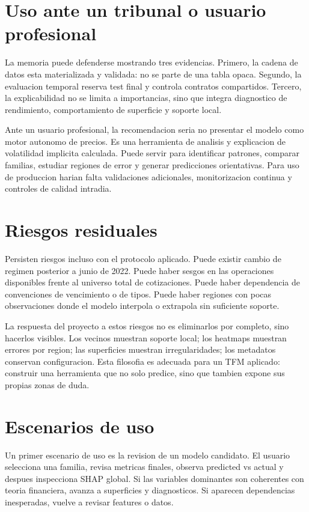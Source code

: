 \section{Uso ante un tribunal o usuario profesional}

La memoria puede defenderse mostrando tres evidencias. Primero, la cadena de datos esta materializada y validada: no se parte de una tabla opaca. Segundo, la evaluacion temporal reserva test final y controla contratos compartidos. Tercero, la explicabilidad no se limita a importancias, sino que integra diagnostico de rendimiento, comportamiento de superficie y soporte local.

Ante un usuario profesional, la recomendacion seria no presentar el modelo como motor autonomo de precios. Es una herramienta de analisis y explicacion de volatilidad implicita calculada. Puede servir para identificar patrones, comparar familias, estudiar regiones de error y generar predicciones orientativas. Para uso de produccion harian falta validaciones adicionales, monitorizacion continua y controles de calidad intradia.

\section{Riesgos residuales}

Persisten riesgos incluso con el protocolo aplicado. Puede existir cambio de regimen posterior a junio de 2022. Puede haber sesgos en las operaciones disponibles frente al universo total de cotizaciones. Puede haber dependencia de convenciones de vencimiento o de tipos. Puede haber regiones con pocas observaciones donde el modelo interpola o extrapola sin suficiente soporte.

La respuesta del proyecto a estos riesgos no es eliminarlos por completo, sino hacerlos visibles. Los vecinos muestran soporte local; los heatmaps muestran errores por region; las superficies muestran irregularidades; los metadatos conservan configuracion. Esta filosofia es adecuada para un TFM aplicado: construir una herramienta que no solo predice, sino que tambien expone sus propias zonas de duda.

\section{Escenarios de uso}

Un primer escenario de uso es la revision de un modelo candidato. El usuario selecciona una familia, revisa metricas finales, observa predicted vs actual y despues inspecciona SHAP global. Si las variables dominantes son coherentes con teoria financiera, avanza a superficies y diagnosticos. Si aparecen dependencias inesperadas, vuelve a revisar features o datos.

